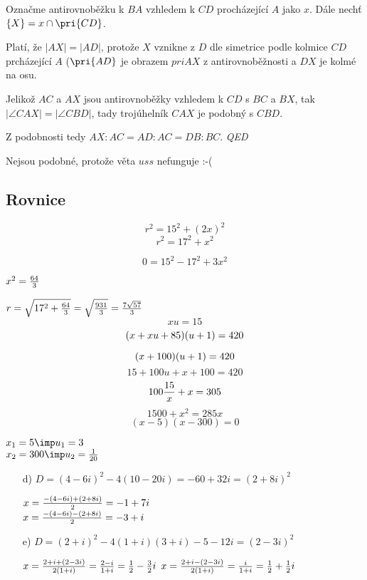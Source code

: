 Označme antirovnoběžku k $BA$ vzhledem k $CD$ procházející $A$ jako $x$. Dále nechť $\zs{X}=x\cap\pri{CD}$.

Platí, že $|AX|=|AD|$, protože $X$ vznikne z $D$ dle simetrice podle kolmice $CD$ prcházející $A$ ($\pri{AD}$ je obrazem $pri{AX}$ z antirovnoběžnosti a $DX$ je kolmé na osu.

Jelikož $AC$ a $AX$ jsou antirovnoběžky vzhledem k $CD$ s $BC$ a $BX$, tak $|\angle CAX|=|\angle CBD|$, tady trojúhelník $CAX$ je podobný s $CBD$.

Z podobnosti tedy $AX:AC = AD:AC = DB:BC$. \emph{QED}

Nejsou podobné, protože věta $uss$ nefunguje :-(


\subsection{Rovnice}


$$r^2 = 15^2+(2x)^2$$
$$r^2 = 17^2+x^2$$

$$0 = 15^2-17^2+3x^2$$

$x^2=\frac{64}3$

$r=\sqrt{17^2+\frac{64}3} = \sqrt{\frac{931}3} = \frac{7\sqrt{57}}3$
$$xu=15$$
$$(x+xu+85)\*(u+1) = 420$$

$$(x+100)\*(u+1) = 420$$
$$15+100u + x + 100 = 420$$
$$ 100 \frac{15}x + x  = 305 $$
$$ 1500  + x^2  = 285x $$
$$(x-5)(x-300) = 0$$

$x_1=5 \imp u_1 = 3$\\
$x_2=300 \imp u_2 = \f1{20}$

\begin{enumerate}
	\item[d)] $ D = (4-6i)^2 - 4 (10-20i) = -60+32 i = (2+8i)^2 $

		$x = \frac{-(4-6i)+(2+8i)}{2} = -1+7i $\\
		$x = \frac{-(4-6i)-(2+8i)}{2} = -3+i $
	\item[e)]
		$D = (2+i)^2-4(1+i)(3+i) -5-12i = (2-3i)^2$

		$x = \frac{2+i+(2-3i)}{2(1+i)} = \frac{2-i}{1+i} = \frac12-\frac32 i$
		$x = \frac{2+i-(2-3i)}{2(1+i)} = \frac{i}{1+i} = \frac12+\frac12 i$
\end{enumerate}



\EndDoc
